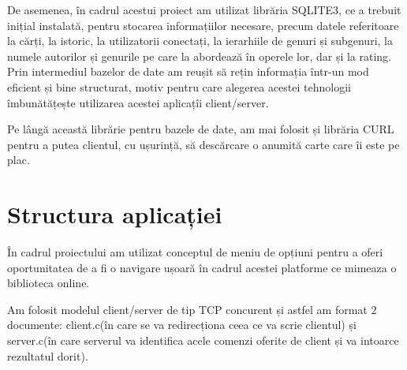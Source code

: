 \documentclass{article}
\begin{document}
De asemenea, în cadrul acestui proiect am utilizat librăria SQLITE3, ce a trebuit inițial instalată, pentru stocarea informațiilor necesare, precum datele referitoare la cărți, la istoric, la utilizatorii conectați, la ierarhiile de genuri și subgenuri, la numele autorilor și genurile pe care la abordează în operele lor, dar  și la rating. Prin intermediul bazelor de date am reușit să rețin informația într-un mod eficient și bine structurat, motiv pentru care alegerea acestei tehnologii îmbunătățește utilizarea acestei aplicațîi client/server.

Pe lângă această librărie pentru bazele de date, am mai folosit și librăria CURL pentru a putea clientul, cu ușurință, să descărcare o anumită carte care îi este pe plac.

\section{Structura aplicației}
\hspace{0.5cm}În cadrul proiectului am utilizat conceptul de meniu de opțiuni pentru a oferi oportunitatea de a fi o navigare ușoară în cadrul acestei platforme ce mimeaza o biblioteca online.

Am folosit modelul client/server de tip TCP concurent și astfel am format $2$ documente: client.c(în care se va redirecționa ceea ce va scrie clientul) și server.c(în care serverul va identifica acele comenzi oferite de client și va intoarce rezultatul dorit).
\end{document}
